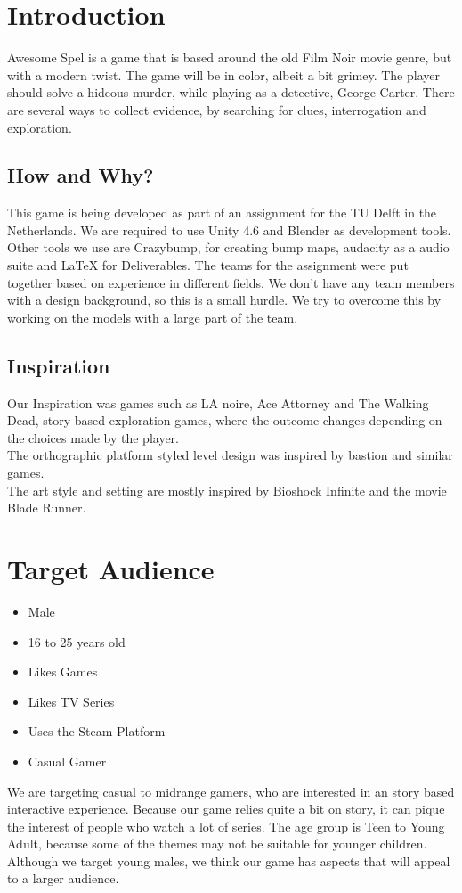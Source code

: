 \documentclass{article}
\begin{document}
	\newpage

\section{Introduction}
	Awesome Spel is a game that is based around the old Film Noir movie genre, but with a modern twist. The game will be in color, albeit a bit grimey. The player should solve a hideous murder, while playing as a detective, George Carter. There are several ways to collect evidence, by searching for clues, interrogation and exploration.

	\subsection{How and Why?}
		This game is being developed as part of an assignment for the TU Delft in the Netherlands. We are required to use Unity 4.6 and Blender as development tools. Other tools we use are Crazybump, for creating bump maps, audacity as a audio suite and LaTeX for Deliverables. The teams for the assignment were put together based on experience in different fields. We don't have any team members with a design background, so this is a small hurdle. We try to overcome this by working on the models with a large part of the team.

	\subsection{Inspiration}
		Our Inspiration was games such as LA noire, Ace Attorney and The Walking Dead, story based exploration games, where the outcome changes depending on the choices made by the player.\\
		The orthographic platform styled level design was inspired by bastion and similar games.\\
		The art style and setting are mostly inspired by Bioshock Infinite and the movie Blade Runner.
\section{Target Audience}
	\begin{itemize}
		\item Male
		\item 16 to 25 years old
		\item Likes Games
		\item Likes TV Series
		\item Uses the Steam Platform
		\item Casual Gamer
	\end{itemize}
	We are targeting casual to midrange gamers, who are interested in an story based interactive experience. Because our game relies quite a bit on story, it can pique the interest of people who watch a lot of series. The age group is Teen to Young Adult, because some of the themes may not be suitable for younger children. Although we target young males, we think our game has aspects that will appeal to a larger audience.
\end{document}
